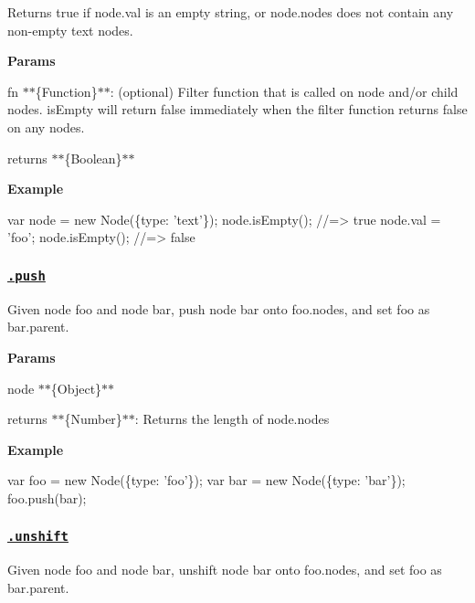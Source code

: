 Returns true if {\ttfamily node.\+val} is an empty string, or {\ttfamily node.\+nodes} does not contain any non-\/empty text nodes.

{\bfseries Params}


\begin{DoxyItemize}
\item {\ttfamily fn} $\ast$$\ast$\{Function\}$\ast$$\ast$\+: (optional) Filter function that is called on {\ttfamily node} and/or child nodes. {\ttfamily is\+Empty} will return false immediately when the filter function returns false on any nodes.
\item {\ttfamily returns} $\ast$$\ast$\{Boolean\}$\ast$$\ast$
\end{DoxyItemize}

{\bfseries Example}


\begin{DoxyCode}
var node = new Node(\{type: 'text'\});
node.isEmpty(); //=> true
node.val = 'foo';
node.isEmpty(); //=> false
\end{DoxyCode}


\subsubsection*{\href{index.js#L118}{\tt .push}}

Given node {\ttfamily foo} and node {\ttfamily bar}, push node {\ttfamily bar} onto {\ttfamily foo.\+nodes}, and set {\ttfamily foo} as {\ttfamily bar.\+parent}.

{\bfseries Params}


\begin{DoxyItemize}
\item {\ttfamily node} $\ast$$\ast$\{Object\}$\ast$$\ast$
\item {\ttfamily returns} $\ast$$\ast$\{Number\}$\ast$$\ast$\+: Returns the length of {\ttfamily node.\+nodes}
\end{DoxyItemize}

{\bfseries Example}


\begin{DoxyCode}
var foo = new Node(\{type: 'foo'\});
var bar = new Node(\{type: 'bar'\});
foo.push(bar);
\end{DoxyCode}


\subsubsection*{\href{index.js#L140}{\tt .unshift}}

Given node {\ttfamily foo} and node {\ttfamily bar}, unshift node {\ttfamily bar} onto {\ttfamily foo.\+nodes}, and set {\ttfamily foo} as {\ttfamily bar.\+parent}.

